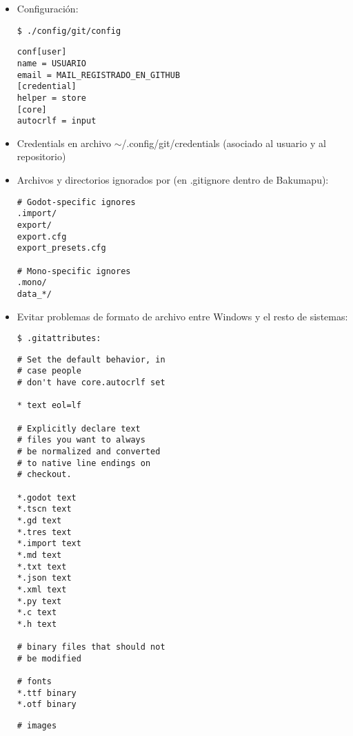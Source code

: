 \begin{itemize}[label=-]
	\item Configuración:
	\begin{lstlisting}
$ ./config/git/config
	\end{lstlisting}
	
	\begin{lstlisting}
conf[user]
name = USUARIO
email = MAIL_REGISTRADO_EN_GITHUB
[credential]
helper = store
[core]
autocrlf = input
	\end{lstlisting}
	
	\item Credentials en archivo $\sim$/.config/git/credentials (asociado al usuario y al repositorio)
	
	\item Archivos y directorios ignorados por  (en .gitignore dentro de Bakumapu):
	\begin{lstlisting}
# Godot-specific ignores
.import/
export/
export.cfg
export_presets.cfg

# Mono-specific ignores
.mono/
data_*/
	\end{lstlisting}
	
	
	\item Evitar problemas de formato de archivo entre Windows y el resto de sistemas:
	\begin{lstlisting}
$ .gitattributes:
	\end{lstlisting}
	\noindent\begin{minipage}{.45\textwidth}
	\begin{lstlisting}
# Set the default behavior, in
# case people
# don't have core.autocrlf set

* text eol=lf

# Explicitly declare text
# files you want to always
# be normalized and converted 
# to native line endings on
# checkout.

*.godot text
*.tscn text
*.gd text
*.tres text
*.import text
*.md text
*.txt text
*.json text
*.xml text
*.py text
*.c text
*.h text

# binary files that should not
# be modified

# fonts
*.ttf binary
*.otf binary
	\end{lstlisting}
	\end{minipage}\hfill
	\begin{minipage}{.45\textwidth}
	\begin{lstlisting}[escapechar=\%]
# images


\end{lstlisting}
\end{minipage}
\end{itemize}

